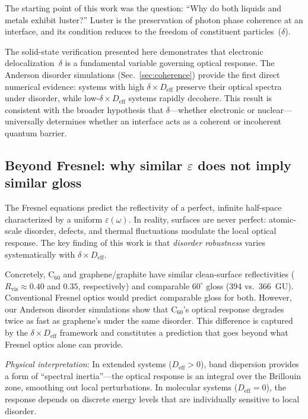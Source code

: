 \documentclass[twocolumn,showpacs,preprintnumbers,amsmath,amssymb,prb]{revtex4-2}
\begin{document}
The starting point of this work was the question: ``Why do both liquids
and metals exhibit luster?'' Luster is the preservation of photon phase
coherence at an interface, and its condition reduces to the freedom of
constituent particles~($\delta$).

The solid-state verification presented here demonstrates that electronic
delocalization~$\delta$ is a fundamental variable governing optical
response. The Anderson disorder simulations
(Sec.~\ref{sec:coherence}) provide the first direct numerical evidence:
systems with high $\delta \times D_\mathrm{eff}$ preserve their optical
spectra under disorder, while low-$\delta \times D_\mathrm{eff}$
systems rapidly decohere. This result is consistent with the broader
hypothesis that $\delta$---whether electronic or nuclear---universally
determines whether an interface acts as a coherent or incoherent quantum
barrier.

\subsection{Beyond Fresnel: why similar $\varepsilon$ does not imply
  similar gloss}

The Fresnel equations predict the reflectivity of a perfect, infinite
half-space characterized by a uniform $\varepsilon(\omega)$. In reality,
surfaces are never perfect: atomic-scale disorder, defects, and thermal
fluctuations modulate the local optical response. The key finding of
this work is that \emph{disorder robustness} varies systematically with
$\delta \times D_\mathrm{eff}$.

Concretely, C$_{60}$ and graphene/graphite have similar clean-surface
reflectivities ($R_\mathrm{vis} \approx 0.40$ and $0.35$,
respectively) and comparable $60^\circ$ gloss (394 vs.\ 366~GU).
Conventional Fresnel optics would predict comparable gloss for both.
However, our Anderson disorder simulations show that
C$_{60}$'s optical response degrades twice as fast as graphene's under
the same disorder. This difference is captured by the
$\delta \times D_\mathrm{eff}$ framework and constitutes a prediction
that goes beyond what Fresnel optics alone can provide.

\emph{Physical interpretation}: In extended systems ($D_\mathrm{eff} > 0$),
band dispersion provides a form of ``spectral inertia''---the optical
response is an integral over the Brillouin zone, smoothing out local
perturbations. In molecular systems ($D_\mathrm{eff} = 0$), the
response depends on discrete energy levels that are individually
sensitive to local disorder.
\end{document}
